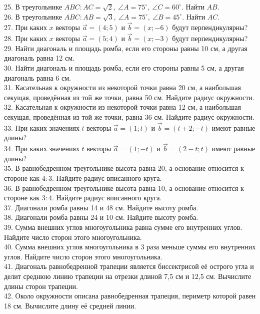 \documentclass[12pt]{article}
\begin{document}
25. В треугольнике $ABC: AC=\sqrt{2},\ \angle A=75^\circ,\ \angle C=60^\circ.$ Найти $AB.$\\
26. В треугольнике $ABC: AB=\sqrt{3},\ \angle A=75^\circ,\ \angle B=45^\circ.$ Найти $AC.$\\
27. При каких $x$ векторы $\vec{a}=(4;5)$ и $\vec{b}=(x;-6)$ будут перпендикулярны?\\
28. При каких $x$ векторы $\vec{a}=(5;4)$ и $\vec{b}=(x;-3)$ будут перпендикулярны?\\
29. Найти диагональ и площадь ромба, если его стороны равны 10 см, а другая диагональ равна 12 см.\\
30. Найти диагональ и площадь ромба, если его стороны равны 5 см, а другая диагональ равна 6 см.\\
31. Касательная к окружности из некоторой точки равна 20 см, а наибольшая секущая, проведённая из той же точки, равна 50 см. Найдите радиус окружности.\\
32. Касательная к окружности из некоторой точки равна 12 см, а наибольшая секущая, проведённая из той же точки, равна 36 см. Найдите радиус окружности.\\
33. При каких значениях $t$ векторы $\vec{a}=(1;t)$ и $\vec{b}=(t+2;-t)$ имеют равные длины?\\
34. При каких значениях $t$ векторы $\vec{a}=(1;-t)$ и $\vec{b}=(2-t;t)$ имеют равные длины?\\
35. В равнобедренном треугольнике высота равна 20, а основание относится к стороне как $4:3.$ Найдите радиус вписанного круга.\\
36. В равнобедренном треугольнике высота равна 10, а основание относится к стороне как $3:4.$ Найдите радиус вписанного круга.\\
37. Диагонали ромба равны 14 и 48 см. Найдите высоту ромба.\\
38. Диагонали ромба равны 24 и 10 см. Найдите высоту ромба.\\
39. Сумма внешних углов многоугольника равна сумме его внутренних углов. Найдите число сторон этого многоугольника.\\
40. Сумма внешних углов многоугольника в 3 раза меньше суммы его внутренних углов. Найдите число сторон этого многоугольника.\\
41. Диагональ равнобедренной трапеции является биссектрисой её острого угла и делит среднюю линию трапеции на отрезки длиной 7,5 см и 12,5 см. Вычислите длины сторон трапеции.\\
42. Около окружности описана равнобедренная трапеция, периметр которой равен 18 см. Вычислите длину её средней линии.\\
\end{document}
